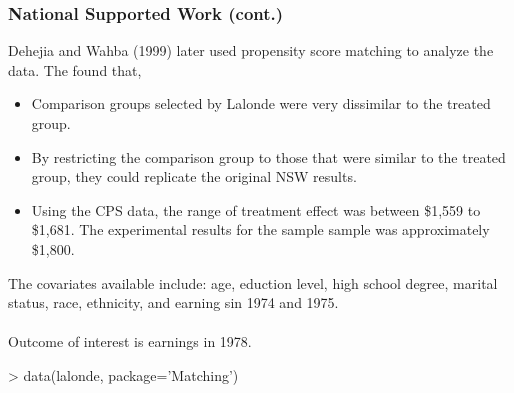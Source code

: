 \documentclass[10pt,slidestop,mathserif,c]{beamer}
\begin{document}
\begin{frame}
    \frametitle{National Supported Work (cont.)}
    Dehejia and Wahba (1999) later used propensity score matching to analyze the data. The found that,
    \begin{itemize}
        \item Comparison groups selected by Lalonde were very dissimilar to the treated group.
        \item By restricting the comparison group to those that were similar to the treated group, they could replicate the original NSW results.
        \item Using the CPS data, the range of treatment effect was between \$1,559 to \$1,681. The experimental results for the sample sample was approximately \$1,800.
    \end{itemize}

    The covariates available include: age, eduction level, high school degree, marital status, race, ethnicity, and earning sin 1974 and 1975.
    \ \\ \ \\
    Outcome of interest is earnings in 1978.
    
\begin{Schunk}
\begin{Sinput}
> data(lalonde, package='Matching')
\end{Sinput}
\end{Schunk}
\end{frame}
\end{document}
